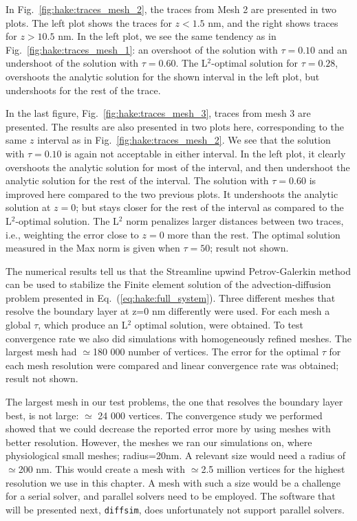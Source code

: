In Fig.~\ref{fig:hake:traces_mesh_2}, the traces from Mesh 2 are
presented in two plots. The left plot shows the traces for $z<1.5$ nm,
and the right shows traces for $z>10.5$ nm. In the left plot, we see
the same tendency as in Fig.~\ref{fig:hake:traces_mesh_1}: an
overshoot of the solution with $\tau=0.10$ and an undershoot of the
solution with $\tau=0.60$. The L$^2$-optimal solution for $\tau=0.28$,
overshoots the analytic solution for the shown interval in the left
plot, but undershoots for the rest of the trace. \par

In the last figure, Fig.~\ref{fig:hake:traces_mesh_3}, traces from
mesh 3 are presented. The results are also presented in two plots
here, corresponding to the same $z$ interval as in
Fig.~\ref{fig:hake:traces_mesh_2}. We see that the solution with
$\tau=0.10$ is again not acceptable in either interval. In the left
plot, it clearly overshoots the analytic solution for most of the
interval, and then undershoot the analytic solution for the rest of
the interval. The solution with $\tau=0.60$ is improved here compared
to the two previous plots. It undershoots the analytic solution at
$z=0$; but stays closer for the rest of the interval as compared to
the L$^2$-optimal solution. The L$^2$ norm penalizes larger distances
between two traces, i.e., weighting the error close to $z=0$ more than
the rest. The optimal solution measured in the Max norm is given when
$\tau=50$; result not shown.\par

The numerical results tell us that the Streamline upwind
Petrov-Galerkin method can be used to stabilize the Finite element
solution of the advection-diffusion problem presented in
Eq.~(\ref{eq:hake:full_system}). Three different meshes that resolve
the boundary layer at z=0 nm differently were used. For each mesh a
global $\tau$, which produce an L$^2$ optimal solution, were
obtained. To test convergence rate we also did simulations with
homogeneously refined meshes. The largest mesh had $\simeq$180 000
number of vertices. The error for the optimal $\tau$ for each mesh
resolution were compared and linear convergence rate was obtained;
result not shown.\par

The largest mesh in our test problems, the one that resolves the
boundary layer best, is not large: $\simeq$ 24 000 vertices. The
convergence study we performed showed that we could decrease the
reported error more by using meshes with better resolution. However,
the meshes we ran our simulations on, where physiological small
meshes; radius=20nm. A relevant size would need a radius of
$\simeq$200 nm. This would create a mesh with $\simeq$2.5 million
vertices for the highest resolution we use in this chapter. A mesh
with such a size would be a challenge for a serial solver, and
parallel solvers need to be employed. The software that will be
presented next, \texttt{diffsim}, does unfortunately not support
parallel solvers. \par

